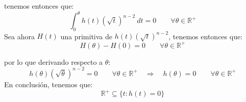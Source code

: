 \begin{ejercicio}
    tenemos entonces que:
    \begin{equation*}
        \int_{0}^{\theta} h(t){\left(\sqrt{t}\right)}^{n-2}~dt = 0 \qquad \forall \theta\in \mathbb{R}^+
    \end{equation*}
    Sea ahora $H(t)$ una primitiva de $h(t){\left(\sqrt{t}\right)}^{n-2}$, tenemos entonces que:
    \begin{equation*}
        H(\theta) - H(0) = 0 \qquad \forall \theta\in \mathbb{R}^+
    \end{equation*}

    por lo que derivando respecto a $\theta$:
    \begin{equation*}
        h(\theta) {\left(\sqrt{\theta}\right)}^{n-2} = 0 \qquad \forall \theta\in \mathbb{R}^+ \quad \Longrightarrow \quad  h(\theta) = 0 \qquad \forall \theta\in \mathbb{R}^+
    \end{equation*}
    En conclusión, tenemos que:
    \begin{equation*}
        \mathbb{R}^+ \subseteq \{t:h(t) = 0\}
    \end{equation*}


\end{ejercicio}
